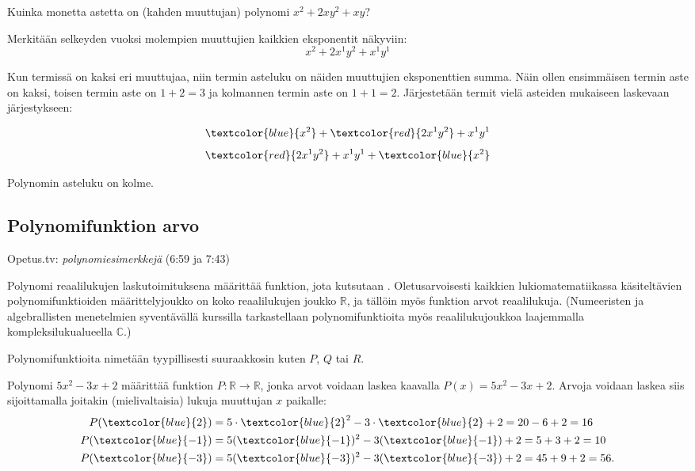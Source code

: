 \begin{esimerkki}
	Kuinka monetta astetta on (kahden muuttujan) polynomi $x^2+2xy^2+xy$?
\begin{esimratk}
Merkitään selkeyden vuoksi molempien muuttujien kaikkien eksponentit näkyviin: \\
\[x^2+2x^1y^2+x^1y^1\]

Kun termissä on kaksi eri muuttujaa, niin termin asteluku on näiden muuttujien eksponenttien summa. Näin ollen ensimmäisen termin aste on kaksi, toisen termin aste on $1+2=3$ ja kolmannen termin aste on $1+1=2$. Järjestetään termit vielä asteiden mukaiseen laskevaan järjestykseen:

\[\textcolor{blue}{x^2}+\textcolor{red}{2x^1y^2}+x^1y^1\]
\[\textcolor{red}{2x^1y^2}+x^1y^1+\textcolor{blue}{x^2}\]

\end{esimratk} 

\begin{esimvast}
Polynomin asteluku on kolme.
\end{esimvast}

\end{esimerkki}

\subsection*{Polynomifunktion arvo}

{Opetus.tv: \emph{polynomiesimerkkejä} (6:59 ja 7:43)}

Polynomi reaalilukujen laskutoimituksena määrittää funktion, jota kutsutaan . Oletusarvoisesti kaikkien lukiomatematiikassa käsiteltävien polynomifunktioiden määrittelyjoukko on koko reaalilukujen joukko $\mathbb{R}$, ja tällöin myös funktion arvot reaalilukuja. (Numeeristen ja algebrallisten menetelmien syventävällä kurssilla tarkastellaan polynomifunktioita myös reaalilukujoukkoa laajemmalla kompleksilukualueella $\mathbb{C}$.)

Polynomifunktioita nimetään tyypillisesti suuraakkosin kuten $P$, $Q$ tai $R$.

\begin{esimerkki}

Polynomi $5x^2-3x+2$ määrittää funktion $P:\mathbb{R}\rightarrow \mathbb{R}$, jonka arvot voidaan laskea kaavalla $P(x)=5x^2-3x+2$. Arvoja voidaan laskea siis sijoittamalla joitakin (mielivaltaisia) lukuja muuttujan $x$ paikalle:
\begin{align*}
    P(\textcolor{blue}{2}) & = 5\cdot \textcolor{blue}{2}^2-3\cdot \textcolor{blue}{2}+2 = 20 - 6 + 2 = 16 \\
    P(\textcolor{blue}{-1}) & = 5(\textcolor{blue}{-1})^2-3(\textcolor{blue}{-1})+2 = 5 + 3 + 2 = 10 \\
    P(\textcolor{blue}{-3}) & = 5(\textcolor{blue}{-3})^2-3(\textcolor{blue}{-3})+2 = 45 + 9 + 2 = 56.
\end{align*}
\end{esimerkki}

